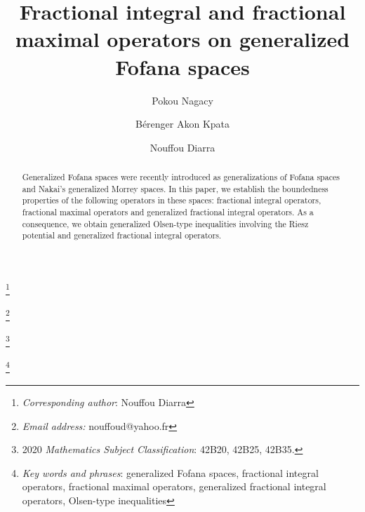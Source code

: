 \documentclass[a4paper,12pt,intlimits,oneside]{amsart}
\numberwithin{equation}{section}
\numberwithin{equation}{section}
\theoremstyle{definition}
\begin{document}
\title []{Fractional integral and fractional maximal operators on generalized Fofana spaces}

\author[P. Nagacy]{Pokou Nagacy}
\address{Laboratoire des Sciences et Technologies de l'Environnement, UFR Environnement, Universit\'e Jean Lorougnon
GUEDE, BP 150 Daloa, C\^ote d'Ivoire}

\author[B. A. Kpata]{B\'erenger Akon Kpata}
\address{Laboratoire de Math\'ematiques et Informatique, UFR Sciences Fondamentales et
Appliquées,
 Université Nangui Abrogoua,
 02 BP 801 Abidjan 02,  C\^ote d'Ivoire}

\author[N. Diarra]{Nouffou Diarra}
\address{Laboratoire de Math\'ematiques et Applications, UFR Math\'ematiques et Informatique,
 Universit\'e F\'elix
 Houphou\"et-Boigny,
 22 BP 582 Abidjan 22,  C\^ote d'Ivoire}




 \renewcommand{\thefootnote}{}
\footnote{\emph{Corresponding author}: Nouffou Diarra}

\footnote{\emph{Email address:} nouffoud@yahoo.fr}

\footnote{2020 \emph{Mathematics Subject Classification}: 42B20, 42B25, 42B35.}

\footnote{\emph{Key words and phrases}: generalized Fofana spaces, fractional integral operators, fractional maximal operators, generalized   fractional integral operators, Olsen-type inequalities}

\renewcommand{\thefootnote}{\arabic{footnote}}
\setcounter{footnote}{0}

\begin{abstract}
Generalized Fofana spaces were recently introduced as generalizations of Fofana spaces and Nakai's generalized Morrey spaces. In this paper, we establish the boundedness properties of the following operators in these spaces: fractional integral operators, fractional maximal operators and generalized fractional integral operators. As a consequence, we obtain generalized Olsen-type inequalities involving the Riesz potential and generalized fractional integral operators.
\end{abstract}

\maketitle
\end{document}
